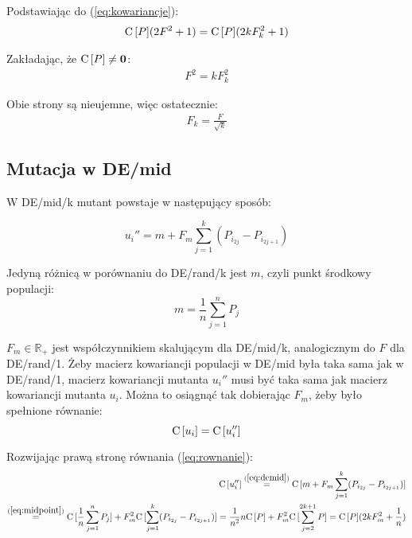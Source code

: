 Podstawiając do (\ref{eq:kowariancje}):
\begin{align*}
{\rm C}\,[P](2F^2 + 1) = {\rm C}\,[P](2kF_k^2 + 1)
\end{align*}

Zakładając, że ${\rm C}\,[P] \neq \textbf{0}$:
\begin{align*}
F^2 = kF_k^2
\end{align*}

Obie strony są nieujemne, więc ostatecznie:
\begin{align*}
F_k = \frac{F}{\sqrt{k}}
\end{align*}

\subsection{Mutacja w DE/mid}

W DE/mid/k mutant powstaje w następujący sposób:

\begin{equation} \label{eq:demid}
u_i'' = m + F_m\sum\limits_{j=1}^k (P_{i_{2j}} - P_{i_{2j+1}})
\end{equation}

Jedyną różnicą w porównaniu do DE/rand/k jest $m$, czyli punkt środkowy populacji:
\begin{equation} \label{eq:midpoint}
m = \frac{1}{n}\sum\limits_{j=1}^n P_j
\end{equation}

$F_m\in\mathbb{R_+}$ jest współczynnikiem skalującym dla DE/mid/k, analogicznym do $F$ dla DE/rand/1. 
Żeby macierz kowariancji populacji w DE/mid była taka sama jak w DE/rand/1, 
macierz kowariancji mutanta $u_i''$ musi być taka sama jak macierz kowariancji mutanta $u_i$.
Można to osiągnąć tak dobierając $F_m$, żeby było spełnione równanie:
\begin{equation} \label{eq:rownanie}
{\rm C}\,[u_i] = {\rm C}\,[u_i'']
\end{equation}

Rozwijając prawą stronę równania (\ref{eq:rownanie}):
\begin{align*}
{\rm C}\,[u_i''] \overset{(\ref{eq:demid})}{=} {\rm C}\,[m + F_m\sum\limits_{j=1}^k (P_{i_{2j}} - P_{i_{2j+1}})] \\
\overset{(\ref{eq:midpoint})}{=} {\rm C}\,[\frac{1}{n}\sum\limits_{j=1}^n P_j] + F_m^2{\rm C}\,[\sum\limits_{j=1}^k (P_{i_{2j}} - P_{i_{2j+1}})] 
= \frac{1}{n^2}n{\rm C}\,[P] + F_m^2{\rm C}\,[\sum\limits_{j=2}^{2k+1} P] = {\rm C}\,[P](2kF_m^2 + \frac{1}{n})
\end{align*}

